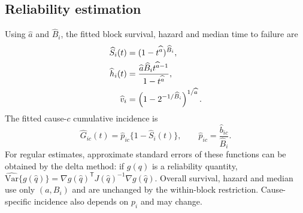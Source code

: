 \documentclass[a4paper,11pt]{article}
\begin{document}
\subsection{Reliability estimation}
Using $\widehat a$ and $\widehat B_i$, the fitted block survival, hazard and median time to failure are
\begin{align}\label{eq:reliability}
\widehat S_i(t)&=(1-t^{\widehat a})^{\widehat B_i},\\\notag
\widehat h_i(t)&=\frac{\widehat a\widehat B_i t^{\widehat a-1}}{1-t^{\widehat a}},\\\notag
\widehat v_i&=\left(1-2^{-1/\widehat B_i}\right)^{1/\widehat a}.
\end{align}
The fitted cause-$c$ cumulative incidence is
\begin{equation}\label{eq:cif}
\widehat G_{ic}(t)=\widehat p_{ic}\{1-\widehat S_i(t)\},\qquad
\widehat p_{ic}=\frac{\widehat b_{ic}}{\widehat B_i}.
\end{equation}
For regular estimates, approximate standard errors of these functions can be obtained by the delta method: if $g(q)$ is a reliability quantity, $\widehat{\mathrm{Var}}\{g(\widehat q)\}=\nabla g(\widehat q)^\mathsf{T}J(\widehat q)^{-1}\nabla g(\widehat q)$. Overall survival, hazard and median use only $(a,B_i)$ and are unchanged by the within-block restriction. Cause-specific incidence also depends on $p_i$ and may change.
\end{document}
